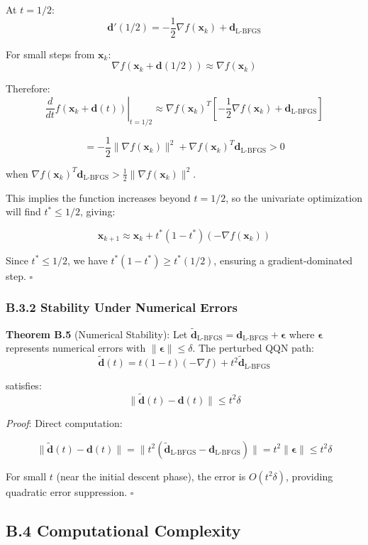 At \(t = 1/2\):
\[\mathbf{d}'(1/2) = -\frac{1}{2}\nabla f(\mathbf{x}_k) + \mathbf{d}_{\text{L-BFGS}}\]

For small steps from \(\mathbf{x}_k\):
\[\nabla f(\mathbf{x}_k + \mathbf{d}(1/2)) \approx \nabla f(\mathbf{x}_k)\]

Therefore:
\[\left.\frac{d}{dt}f(\mathbf{x}_k + \mathbf{d}(t))\right|_{t=1/2} \approx \nabla f(\mathbf{x}_k)^T[-\frac{1}{2}\nabla f(\mathbf{x}_k) + \mathbf{d}_{\text{L-BFGS}}]\]

\[= -\frac{1}{2}\|\nabla f(\mathbf{x}_k)\|^2 + \nabla f(\mathbf{x}_k)^T\mathbf{d}_{\text{L-BFGS}} > 0\]

when \(\nabla f(\mathbf{x}_k)^T\mathbf{d}_{\text{L-BFGS}} > \frac{1}{2}\|\nabla f(\mathbf{x}_k)\|^2\).

This implies the function increases beyond \(t = 1/2\), so the univariate optimization will find \(t^* \leq 1/2\), giving:

\[\mathbf{x}_{k+1} \approx \mathbf{x}_k + t^*(1-t^*)(-\nabla f(\mathbf{x}_k))\]

Since \(t^* \leq 1/2\), we have \(t^*(1-t^*) \geq t^*(1/2)\), ensuring a gradient-dominated step. \(\square\)

\hypertarget{b.3.2-stability-under-numerical-errors}{%
\subsubsection{B.3.2 Stability Under Numerical Errors}\label{b.3.2-stability-under-numerical-errors}}

\textbf{Theorem B.5} (Numerical Stability): Let \(\tilde{\mathbf{d}}_{\text{L-BFGS}} = \mathbf{d}_{\text{L-BFGS}} + \boldsymbol{\epsilon}\) where \(\boldsymbol{\epsilon}\) represents numerical errors with \(\|\boldsymbol{\epsilon}\| \leq \delta\). The perturbed QQN path:
\[\tilde{\mathbf{d}}(t) = t(1-t)(-\nabla f) + t^2 \tilde{\mathbf{d}}_{\text{L-BFGS}}\]

satisfies:
\[\|\tilde{\mathbf{d}}(t) - \mathbf{d}(t)\| \leq t^2\delta\]

\emph{Proof}: Direct computation:

\[\|\tilde{\mathbf{d}}(t) - \mathbf{d}(t)\| = \|t^2(\tilde{\mathbf{d}}_{\text{L-BFGS}} - \mathbf{d}_{\text{L-BFGS}})\| = t^2\|\boldsymbol{\epsilon}\| \leq t^2\delta\]

For small \(t\) (near the initial descent phase), the error is \(O(t^2\delta)\), providing quadratic error suppression. \(\square\)

\hypertarget{b.4-computational-complexity}{%
\subsection{B.4 Computational Complexity}\label{b.4-computational-complexity}}

